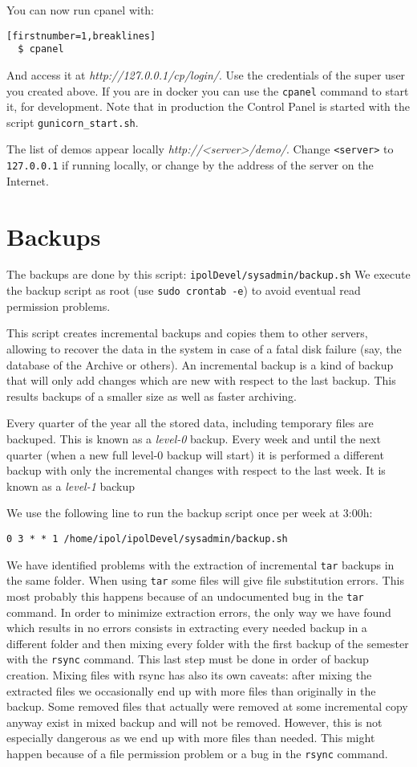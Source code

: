 \documentclass[a4paper,12pt]{article}
\begin{document}
You can now run cpanel with:
\begin{verbatim}[firstnumber=1,breaklines]
  $ cpanel
\end{verbatim}
And access it at \emph{http://127.0.0.1/cp/login/}. Use the credentials of the super user you created
above. If you are in docker you can use the {\tt cpanel} command to start it, for development. Note that in production the Control Panel is started with the script {\tt gunicorn\_start.sh}.

The list of demos appear locally \emph{http://<server>/demo/}. Change {\tt <server>} to {\tt 127.0.0.1} if running locally, or change by the address of the server on the Internet.


\section{Backups}
\label{sec:backups}
The backups are done by this script: {\tt ipolDevel/sysadmin/backup.sh}
We execute the backup script as root (use {\tt sudo crontab -e}) to avoid eventual read permission problems.

This script creates incremental backups and copies them to other servers, allowing to recover the data in the system in case of a fatal disk failure (say, the database of the Archive or others). An incremental backup is a kind of backup that will only add changes which are new with respect to the last backup. This results backups of a smaller size as well as faster archiving.

Every quarter of the year all the stored data, including temporary files are backuped. This is known as a \emph{level-0} backup. Every week and until the next quarter (when a new full level-0 backup will start) it is performed  a different backup with only the incremental changes with respect to the last week. It is known as a \emph{level-1} backup

We use the following line to run the backup script once per week at 3:00h:

{\tt 0 3 * * 1 /home/ipol/ipolDevel/sysadmin/backup.sh}

We have identified problems with the extraction of incremental {\tt tar} backups in the same folder. When using {\tt tar} some files will give file substitution errors. This most probably this happens because of an undocumented bug in the {\tt tar} command. In order to minimize extraction errors, the only way we have found which results in no errors consists in extracting every needed backup in a different folder and then mixing every folder with the first backup of the semester with the {\tt rsync} command. This last step must be done in order of backup creation. Mixing files with rsync has also its own caveats: after mixing the extracted files we occasionally end up with more files than originally in the backup. Some removed files that actually were removed at some incremental copy anyway exist in mixed backup and will not be removed. However, this is not especially dangerous as we end up with more files than needed. This might happen because of a file permission problem or a bug in the {\tt rsync} command.
\end{document}
